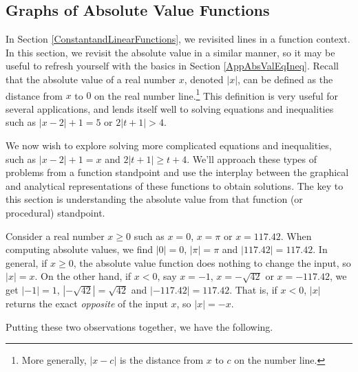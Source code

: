 

\setcounter{footnote}{0}

\label{AbsoluteValueFunctions}

\subsection{Graphs of Absolute Value Functions}
\label{GraphsofAbsoluteValueFunctions}

In Section \ref{ConstantandLinearFunctions}, we revisited lines in a function context.  In this section, we revisit the absolute value in a similar manner, so it may be useful to refresh yourself with the basics in Section \ref{AppAbsValEqIneq}. Recall that the absolute value of a real number $x$, denoted $|x|$, can be  defined as the distance from $x$ to $0$ on the real number line.\footnote{More generally, $|x - c|$ is the distance from $x$ to $c$ on the number line.}  This definition is very useful for several applications, and lends itself well to solving equations and inequalities such as $|x - 2| + 1 = 5$ or $2|t + 1| > 4$.  

\medskip

We now wish to explore solving more complicated equations and inequalities, such as $|x - 2| + 1 = x$ and $2|t + 1| \geq t + 4$. We'll approach these types of problems from a function standpoint and use the interplay between the graphical and analytical representations of these functions to obtain solutions. The key to this section is understanding the absolute value from that function (or procedural) standpoint. 

\medskip

Consider a real number $x \geq 0$ such as $x = 0$, $x = \pi$ or $x = 117.42$.  When computing absolute values, we find $|0| = 0$, $|\pi| = \pi$ and $|117.42| = 117.42$.  In general,  if $x \geq 0$, the absolute value function does nothing to change the input, so $|x| = x$. On the other hand, if $x < 0$, say $x = -1$, $x = -\sqrt{42}$ or $x = -117.42$, we get $|-1| = 1$, $|-\sqrt{42}| = \sqrt{42}$ and $|-117.42| = 117.42$.  That is, if $x < 0$, $|x|$ returns the exact \textit{opposite} of the input $x$, so  $|x| = -x$.  

\medskip

Putting these two observations together, we have the following.

\medskip

